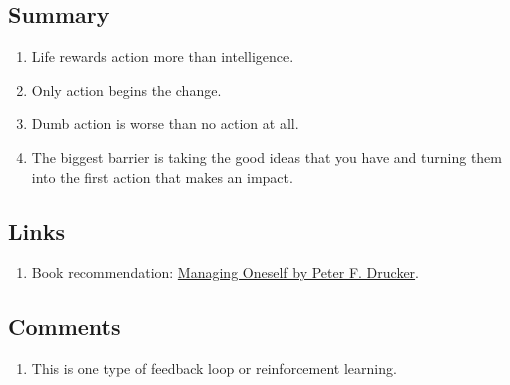 \documentclass[a4paper,12pt]{article}
\begin{document}
\subsection*{ Summary }

\begin{enumerate}

	\item Life rewards action more than intelligence.

	\item Only action begins the change.

	\item Dumb action is worse than no action at all.

	\item The biggest barrier is taking the good ideas that you have and turning them into the first action that makes an impact.

\end{enumerate}



\subsection*{ Links }

\begin{enumerate}

	\item Book recommendation: \href{https://www.goodreads.com/book/show/2477223.Managing_Oneself}{Managing Oneself by Peter F. Drucker}.

\end{enumerate}


\subsection*{ Comments }

\begin{enumerate}

	\item This is one type of feedback loop or reinforcement learning.

\end{enumerate}



\newpage
\end{document}
